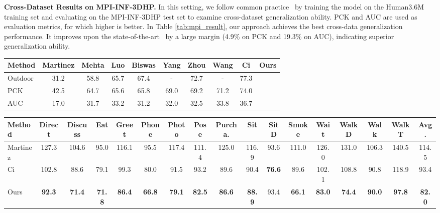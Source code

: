 \documentclass[runningheads]{llncs}
\begin{document}
\noindent\textbf{Cross-Dataset Results on MPI-INF-3DHP.} In this setting, we follow common practice~\cite{luo2018orinet,wang2019generalizing,ci2019optimizing,yang20183d,zhou2017towards} by training the model on the Human3.6M training set and evaluating on the MPI-INF-3DHP test set to examine cross-dataset generalization ability. PCK and AUC are used as evaluation metrics, for which higher is better. In Table \ref{tab:mpi_result}, our approach achieves the best cross-data generalization performance. It improves upon the state-of-the-art~\cite{ci2019optimizing} by a large margin (4.9\% on PCK and 19.3\% on AUC), indicating superior generalization ability. 
\begin{table*}
{
\scriptsize{
\begin{center}
\resizebox{\textwidth}{7mm}
{
\begin{tabular}{ l |c| c|c|c| c |c|c|c|c}
\hline
Method &Martinez \cite{martinez2017simple}&Mehta \cite{mehta2017monocular}&Luo \cite{luo2018orinet}&Biswas \cite{biswas2019lifting}&Yang \cite{yang20183d}&Zhou \cite{zhou2017towards}&Wang \cite{wang2019generalizing}&Ci \cite{ci2019optimizing}&Ours\\
\hline
Outdoor &31.2&58.8&65.7&67.4&-&72.7&-&77.3&\\
\hline
PCK &42.5&64.7&65.6&65.8&69.0&69.2&71.2&74.0& \\
\hline
AUC& 17.0&31.7&33.2&31.2&32.0&32.5&33.8&36.7&\\
\hline
\end{tabular}}
\end{center}
}
}
\caption{Cross-dataset results on MPI-INF-3DHP. All models are trained on Human3.6M and tested on the MPI-INF-3DHP test set.}
\label{tab:mpi_result}
\end{table*}

\begin{table*}
\begin{center}
\resizebox{\textwidth}{7mm}
{
\begin{tabular}{ l c c c c c c c c c c c c c c c c }
\hline
Method & Direct & Discuss & Eat & Greet & Phone& Photo & Pose  & Purcha. & Sit & SitD &Smoke &Wait &WalkD&Walk& WalkT & Avg.\\
\hline
Martinez \cite{martinez2017simple}&127.3&104.6&95.0&116.1&95.5&117.4&111.4&125.0&116.9&93.6&111.0&126.0&131.0&106.3&140.5&114.5\\
\hline
Ci \cite{ci2019optimizing}&102.8&88.6&79.1&99.3&80.0&91.5&93.2&89.6&90.4&\textbf{76.6}&89.6&102.1&108.8&90.8&118.9&93.4\\
\hline
Ours &\textbf{92.3}&\textbf{71.4}&\textbf{71.8}&\textbf{86.4}&\textbf{66.8}&\textbf{79.1}&\textbf{82.5}&\textbf{86.6}&\textbf{88.9}&93.4&\textbf{66.1}&\textbf{83.0}&\textbf{74.4}&\textbf{90.0}&\textbf{97.8}&\textbf{82.0}\\
\hline
\end{tabular}}
\end{center}
\caption{\emph{Cross Action} results compared with \emph{Fully Connected Network} and \emph{Locally Connected Network} on Human3.6M. Smaller values are better. }
\label{tab:lcn}
\end{table*}
\end{document}
